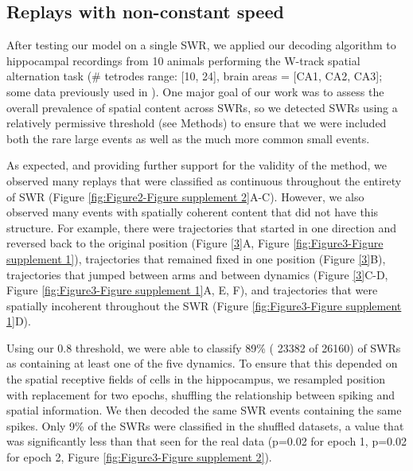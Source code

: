 \documentclass[times, twoside]{zHenriquesLab-StyleBioRxiv}
\begin{document}
\subsection*{Replays with non-constant speed}

After testing our model on a single SWR, we applied our decoding algorithm to hippocampal recordings from 10 animals performing the W-track spatial alternation task (\# tetrodes range: [10, 24], brain areas = [CA1, CA2, CA3]; some data previously used in \cite{KarlssonAwakereplayremote2009, KayConstantSubsecondCycling2020, CarrTransientSlowGamma2012}). One major goal of our work was to assess the overall prevalence of spatial content across SWRs, so we detected SWRs using a relatively permissive threshold (see Methods) to ensure that we were included both the rare large events as well as the much more common small events. 

As expected, and providing further support for the validity of the method, we observed many replays that were classified as continuous throughout the entirety of SWR (Figure \ref{fig:Figure2-Figure supplement 2}A-C). However, we also observed many events with spatially coherent content that did not have this structure. For example, there were trajectories that started in one direction and reversed back to the original position (Figure \ref{3}A, Figure \ref{fig:Figure3-Figure supplement 1}), trajectories that remained fixed in one position (Figure \ref{3}B), trajectories that jumped between arms and between dynamics (Figure \ref{3}C-D, Figure \ref{fig:Figure3-Figure supplement 1}A, E, F), and trajectories that were spatially incoherent throughout the SWR (Figure \ref{fig:Figure3-Figure supplement 1}D).

Using our 0.8 threshold, we were able to classify 89\% ( 23382 of 26160) of SWRs as containing at least one of the five dynamics. To ensure that this depended on the spatial receptive fields of cells in the hippocampus, we resampled position with replacement for two epochs, shuffling the relationship between spiking and spatial information. We then decoded the same SWR events containing the same spikes. Only 9\% of the SWRs were classified in the shuffled datasets, a value that was significantly less than that seen for the real data (p=0.02 for epoch 1, p=0.02 for epoch 2, Figure \ref{fig:Figure3-Figure supplement 2}).
\end{document}
